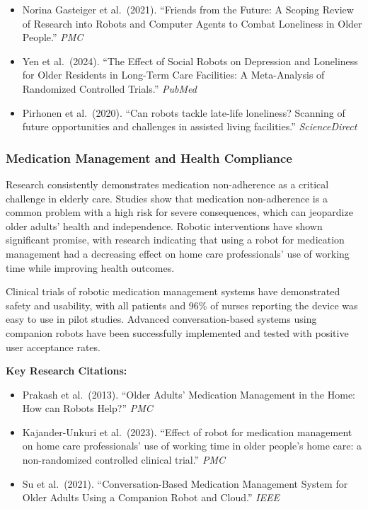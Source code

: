 \documentclass[
  letterpaper,
  DIV=11,
  numbers=noendperiod]{scrartcl}
\providecommand{\tightlist}{%
  \setlength{\itemsep}{0pt}\setlength{\parskip}{0pt}}\usepackage{longtable,booktabs,array}
\begin{document}
\begin{itemize}
\tightlist
\item
  Norina Gasteiger et al.~(2021). ``Friends from the Future: A Scoping
  Review of Research into Robots and Computer Agents to Combat
  Loneliness in Older People.'' \emph{PMC}
\item
  Yen et al.~(2024). ``The Effect of Social Robots on Depression and
  Loneliness for Older Residents in Long-Term Care Facilities: A
  Meta-Analysis of Randomized Controlled Trials.'' \emph{PubMed}
\item
  Pirhonen et al.~(2020). ``Can robots tackle late-life loneliness?
  Scanning of future opportunities and challenges in assisted living
  facilities.'' \emph{ScienceDirect}
\end{itemize}

\subsubsection{Medication Management and Health
Compliance}\label{medication-management-and-health-compliance}

Research consistently demonstrates medication non-adherence as a
critical challenge in elderly care. Studies show that medication
non-adherence is a common problem with a high risk for severe
consequences, which can jeopardize older adults' health and
independence. Robotic interventions have shown significant promise, with
research indicating that using a robot for medication management had a
decreasing effect on home care professionals' use of working time while
improving health outcomes.

Clinical trials of robotic medication management systems have
demonstrated safety and usability, with all patients and 96\% of nurses
reporting the device was easy to use in pilot studies. Advanced
conversation-based systems using companion robots have been successfully
implemented and tested with positive user acceptance rates.

\textbf{Key Research Citations:}

\begin{itemize}
\tightlist
\item
  Prakash et al.~(2013). ``Older Adults' Medication Management in the
  Home: How can Robots Help?'' \emph{PMC}
\item
  Kajander-Unkuri et al.~(2023). ``Effect of robot for medication
  management on home care professionals' use of working time in older
  people's home care: a non-randomized controlled clinical trial.''
  \emph{PMC}
\item
  Su et al.~(2021). ``Conversation-Based Medication Management System
  for Older Adults Using a Companion Robot and Cloud.'' \emph{IEEE}
\end{itemize}
\end{document}

